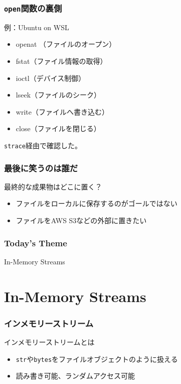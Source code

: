 \documentclass[aspectratio=169,dvipdfmx,14pt,notheorems]{beamer}
\theoremstyle{definition}
\begin{document}
\begin{frame}[fragile]\frametitle{\texttt{open}関数の裏側}

\begin{exampleblock}{例：Ubuntu on WSL}
\begin{itemize}
\item openat （ファイルのオープン）
\item fstat（ファイル情報の取得）
\item ioctl（デバイス制御）
\item lseek（ファイルのシーク）
\item write（ファイルへ書き込む）
\item close（ファイルを閉じる）
\end{itemize}
\end{exampleblock}
\texttt{strace}経由で確認した。

\end{frame}

\begin{frame}\frametitle{最後に笑うのは誰だ}
\begin{block}{最終的な成果物はどこに置く？}
\begin{itemize}
\item ファイルをローカルに保存するのがゴールではない
\item ファイルをAWS S3などの外部に置きたい
\end{itemize}
\end{block}
\end{frame}

\begin{frame}\frametitle{Today's Theme}
\begin{center}
\huge{In-Memory Streams}
\end{center}
\end{frame}

\section{In-Memory Streams}

\begin{frame}\frametitle{インメモリーストリーム}
\begin{block}{インメモリーストリームとは}
\begin{itemize}
\item \texttt{str}や\texttt{bytes}をファイルオブジェクトのように扱える
\item 読み書き可能、ランダムアクセス可能
\end{itemize}
\end{block}
\end{frame}
\end{document}
